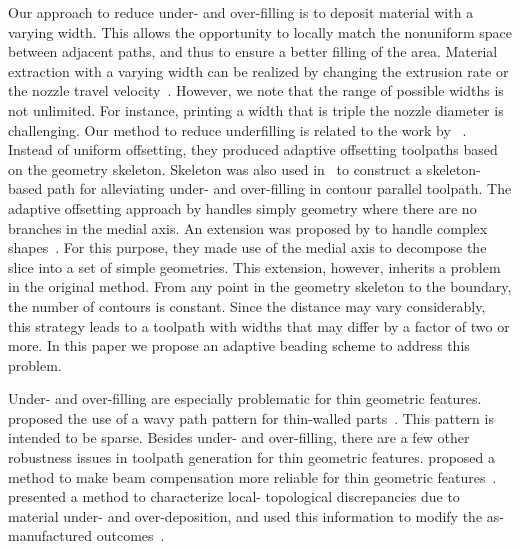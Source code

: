 Our approach to reduce under- and over-filling is to deposit material with a varying width.
This allows the opportunity to locally match the nonuniform space between adjacent paths, and thus to ensure a better filling of the area.
Material extraction with a varying width can be realized by changing the extrusion rate or the nozzle travel velocity~\cite{Ertay2018,Kuipers2018}.
However, we note that the range of possible widths is not unlimited.
For instance, printing a width that is triple the nozzle diameter is challenging.
Our method to reduce underfilling is related to the work by \citeauthor{kao1998optimal}~\cite{kao1998optimal}.
Instead of uniform offsetting, they produced adaptive offsetting toolpaths based on the geometry skeleton. 
Skeleton was also used in~\cite{Jin2017RCIM} to construct a skeleton-based path for alleviating under- and over-filling in contour parallel toolpath. 
The adaptive offsetting approach by \citeauthor{kao1998optimal} handles simply geometry where there are no branches in the medial axis.
An extension was proposed by \citeauthor{Ding2016a} to handle complex shapes~\cite{Ding2016a}.
For this purpose, they made use of the medial axis to decompose the slice into a set of simple geometries.
This extension, however, inherits a problem in the original method.
From any point in the geometry skeleton to the boundary, the number of contours is constant.
Since the distance may vary considerably, this strategy leads to a toolpath with widths that may differ by a factor of two or more.
In this paper we propose an adaptive beading scheme to address this problem. 

Under- and over-filling are especially problematic for thin geometric features.
\citeauthor{Jin2017a} proposed the use of a wavy path pattern for thin-walled parts~\cite{Jin2017a}. 
This pattern is intended to be sparse. 
Besides under- and over-filling, there are a few other robustness issues in toolpath generation for thin geometric features.
\citeauthor{Moesen2011} proposed a method to make beam compensation more reliable for thin geometric features~\cite{Moesen2011}.
\citeauthor{Behandish2019a} presented a method to characterize local- topological discrepancies due to material under- and over-deposition, and used this information to modify the as-manufactured outcomes~\cite{Behandish2019a}. 




